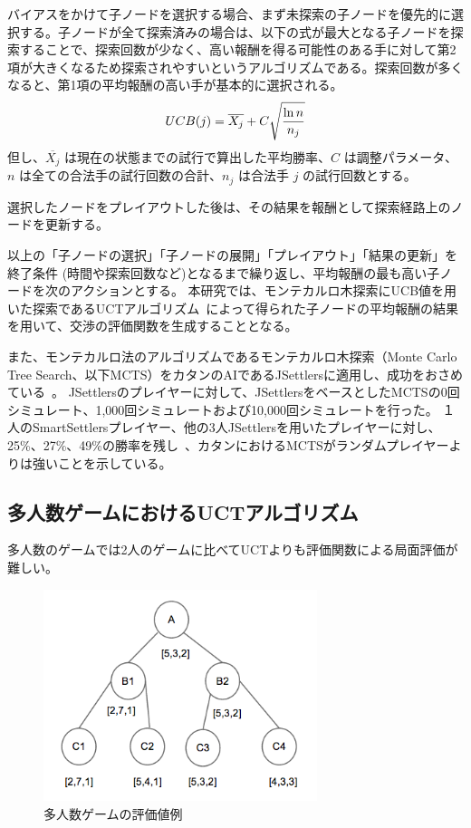 \documentclass[a4, 10pt,dvipdfmx]{jsarticle}
\begin{document}
バイアスをかけて子ノードを選択する場合、まず未探索の子ノードを優先的に選択する。子ノードが全て探索済みの場合は、以下の式が最大となる子ノードを探索することで、探索回数が少なく、高い報酬を得る可能性のある手に対して第2項が大きくなるため探索されやすいというアルゴリズムである。探索回数が多くなると、第1項の平均報酬の高い手が基本的に選択される。
\begin{equation}
  UCB(j)=\overline{X_j} + C\sqrt{\mathstrut \frac{\ln{n}}{n_j}}
\end{equation}
但し、$\overline{X_j}$ は現在の状態までの試行で算出した平均勝率、$C$ は調整パラメータ、$n$ は全ての合法手の試行回数の合計、$n_j$ は合法手 $j$ の試行回数とする。

選択したノードをプレイアウトした後は、その結果を報酬として探索経路上のノードを更新する。

以上の「子ノードの選択」「子ノードの展開」「プレイアウト」「結果の更新」を終了条件 (時間や探索回数など)となるまで繰り返し、平均報酬の最も高い子ノードを次のアクションとする。
本研究では、モンテカルロ木探索にUCB値を用いた探索であるUCTアルゴリズム~\cite{kocsis2006bandit,auer2002finite}によって得られた子ノードの平均報酬の結果を用いて、交渉の評価関数を生成することとなる。

また、モンテカルロ法のアルゴリズムであるモンテカルロ木探索（Monte Carlo Tree Search、以下MCTS）をカタンのAIであるJSettlersに適用し、成功をおさめている~\cite{branca2007using}。
JSettlersのプレイヤーに対して、JSettlersをベースとしたMCTSの0回シミュレート、1,000回シミュレートおよび10,000回シミュレートを行った。
１人のSmartSettlersプレイヤー、他の3人JSettlersを用いたプレイヤーに対し、25\%、27\%、49\%の勝率を残し~\cite{szita2010monte}、カタンにおけるMCTSがランダムプレイヤーよりは強いことを示している。

\subsection{多人数ゲームにおけるUCTアルゴリズム}

多人数のゲームでは2人のゲームに比べてUCTよりも評価関数による局面評価が難しい。~\cite{sturtevant2008analysis}

\begin{figure}[t]
    \begin{center}
      \includegraphics[width=80mm]{img/multi_agent_tree.png}
    \end{center}
    \caption{多人数ゲームの評価値例}
    \label{multi_agent_tree}
\end{figure}
\end{document}
